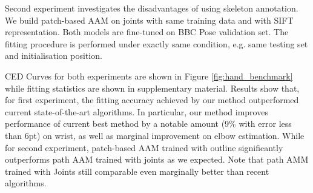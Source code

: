 Second experiment investigates the disadvantages of using skeleton annotation. We build patch-based AAM on joints with same training data and with SIFT representation. Both models are fine-tuned on BBC Pose validation set. The fitting procedure is performed under exactly same condition, e.g. same testing set and initialisation position. 

CED Curves for both experiments are shown in Figure \ref{fig:hand_benchmark} while fitting statistics are shown in supplementary material. Results show that, for first experiment, the fitting accuracy achieved by our method outperformed current state-of-the-art algorithms. In particular, our method improves performance of current best method \cite{pfister2015flowing} by a notable amount (9\% with error less than 6pt) on wrist, as well as marginal improvement on elbow estimation. While for second experiment, patch-based AAM trained with outline significantly outperforms path AAM trained with joints as we expected. Note that path AMM trained with Joints still comparable even marginally better than recent algorithms.






